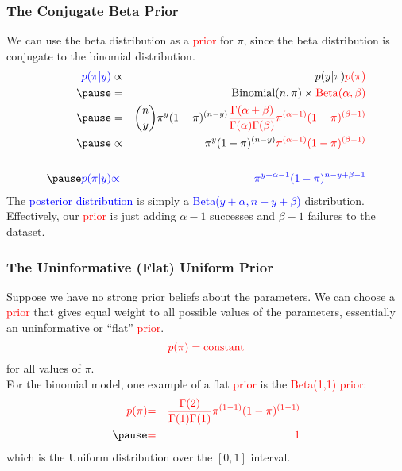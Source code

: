 \documentclass[handout]{beamer}
\begin{document}

\begin{frame}
\frametitle{The Conjugate Beta Prior}
\pause
We can use the beta distribution as a \textcolor{red}{prior} for $\pi$, since the beta
distribution is conjugate to the binomial distribution.\\
\pause
\begin{eqnarray*}
\textcolor{blue}{p(\pi | y)} &\propto& p(y | \pi) \textcolor{red}{p(\pi)} \\
\pause
&=& \mathrm{Binomial}(n, \pi) \times
\textcolor{red}{\mathrm{Beta}(\alpha, \beta)}\\
\pause
&=& \binom{n}{y} \pi^y (1 - \pi)^{(n-y)} \textcolor{red}{\frac{\Gamma (\alpha + \beta)}{\Gamma (\alpha)
\Gamma (\beta)} \pi^{(\alpha - 1)} (1 - \pi)^{(\beta-1)}}\\
\pause
&\propto& \pi^y (1 - \pi)^{(n-y)} \textcolor{red}{\pi^{(\alpha - 1)}
(1 - \pi)^{(\beta-1)}} \\\\
\pause
\textcolor{blue}{p(\pi | y)} &\textcolor{blue}{\propto}& \textcolor{blue}{\pi^{y+\alpha-1} (1-\pi)^{n-y+\beta-1}}
\end{eqnarray*}
\pause
The \textcolor{blue}{posterior distribution} is simply a
\textcolor{blue}{Beta($y+\alpha, n-y+\beta$)} distribution. \pause
Effectively, our \textcolor{red}{prior} is just adding $\alpha-1$
successes and $\beta - 1$ failures to the dataset.
\end{frame}

\begin{frame}
\frametitle{The Uninformative (Flat) Uniform Prior}
\pause
Suppose we have no strong prior beliefs about the parameters.  \pause
We can choose a \textcolor{red}{prior} that gives equal weight to all possible values
of the parameters, essentially an uninformative or ``flat'' \textcolor{red}{prior}. \pause
\begin{equation*}
\textcolor{red}{p(\pi) = \mathrm{constant}}
\end{equation*}
for all values of $\pi$. \\
\pause
\bigskip
For the binomial model, one example of a flat \textcolor{red}{prior} is the \textcolor{red}{Beta(1,1) prior}:
\pause
\begin{eqnarray*}
\textcolor{red}{p(\pi)} &\textcolor{red}{=}& \textcolor{red}{\frac{\Gamma (2)}{\Gamma (1)
\Gamma (1)} \pi^{(1 - 1)} (1 - \pi)^{(1-1)}} \\
\pause
&\textcolor{red}{=}& \textcolor{red}{1}
\end{eqnarray*}
\pause
which is the Uniform distribution over the $[0,1]$ interval.
\end{frame}
\end{document}
